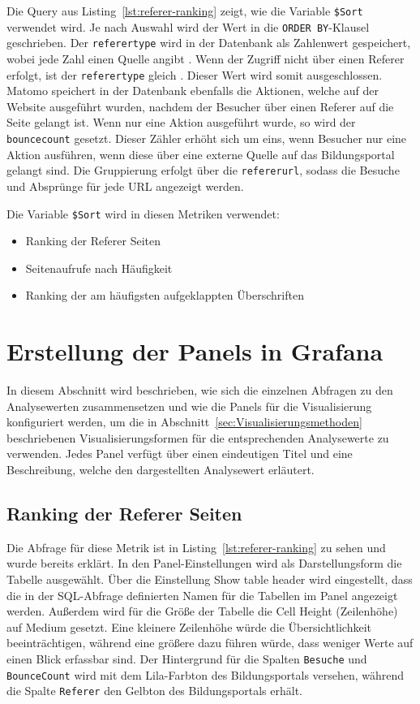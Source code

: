 Die Query aus Listing~\ref{lst:referer-ranking} zeigt, wie die Variable \texttt{\$Sort} verwendet wird. Je nach Auswahl wird der Wert in die {\texttt{ORDER BY}-Klausel} geschrieben. Der \texttt{referer\textunderscore type} wird in der Datenbank als Zahlenwert gespeichert, wobei jede Zahl einen Quelle angibt \parencite{MatomoDBSchema}. Wenn der Zugriff nicht über einen Referer erfolgt, ist der \texttt{referer\textunderscore type} gleich \grqq{}. Dieser Wert wird somit ausgeschlossen. Matomo speichert in der Datenbank ebenfalls die Aktionen, welche auf der Website ausgeführt wurden, nachdem der Besucher über einen Referer auf die Seite gelangt ist. Wenn nur eine Aktion ausgeführt wurde, so wird der \texttt{bounce\textunderscore count} gesetzt. Dieser Zähler erhöht sich um eins, wenn Besucher nur eine Aktion ausführen, wenn diese über eine externe Quelle auf das Bildungsportal gelangt sind. Die Gruppierung erfolgt über die \texttt{referer\textunderscore url}, sodass die Besuche und Absprünge für jede URL angezeigt werden. 

Die Variable \texttt{\$Sort} wird in diesen Metriken verwendet: 
\begin{itemize}
    \item Ranking der Referer Seiten
    \item Seitenaufrufe nach Häufigkeit
    \item Ranking der am häufigsten aufgeklappten Überschriften
\end{itemize}

\section{Erstellung der Panels in Grafana}
In diesem Abschnitt wird beschrieben, wie sich die einzelnen Abfragen zu den Analysewerten zusammensetzen und wie die Panels für die Visualisierung konfiguriert werden, um die in Abschnitt~\ref{sec:Visualisierungsmethoden} beschriebenen Visualisierungsformen für die entsprechenden Analysewerte zu verwenden. Jedes Panel verfügt über einen eindeutigen Titel und eine Beschreibung, welche den dargestellten Analysewert erläutert.

\subsection{Ranking der Referer Seiten}
Die Abfrage für diese Metrik ist in Listing~\ref{lst:referer-ranking} zu sehen und wurde bereits erklärt. In den Panel-Einstellungen wird als Darstellungsform die Tabelle ausgewählt. Über die Einstellung \glqq Show table header\grqq{} wird eingestellt, dass die in der SQL-Abfrage definierten Namen für die Tabellen im Panel angezeigt werden. Außerdem wird für die Größe der Tabelle die \glqq Cell Height\grqq{}
(Zeilenhöhe) auf \glqq Medium\grqq{} gesetzt. Eine kleinere Zeilenhöhe würde die Übersichtlichkeit beeinträchtigen, während eine größere dazu führen würde, dass weniger Werte auf einen Blick erfassbar sind. Der Hintergrund für die Spalten \texttt{Besuche} und \texttt{Bounce\textunderscore Count} wird mit dem Lila-Farbton des Bildungsportals versehen, während die Spalte \texttt{Referer} den Gelbton des Bildungsportals erhält.

